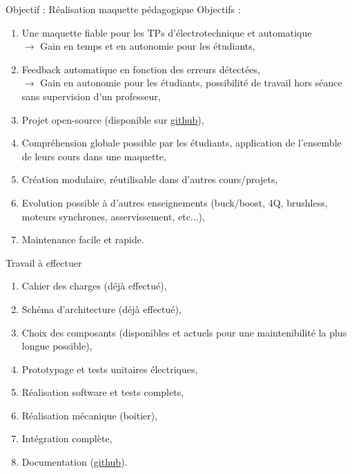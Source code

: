 \documentclass[aspectratio=169]{beamer}
\begin{document}
\begin{frame}{Objectif : Réalisation maquette pédagogique}
	Objectifs : 
	\begin{enumerate}
		\item Une maquette fiable pour les TPs d'électrotechnique et automatique \\
		$\rightarrow$ Gain en temps et en autonomie pour les étudiants,
		\item Feedback automatique en fonction des erreurs détectées, \\
		$\rightarrow$ Gain en autonomie pour les étudiants, possibilité de travail hors séance sans supervision d'un professeur,
		\item Projet open-source (disponible sur \href{https://github.com/DBXYD/AAP_ENSEA_Inverter}{github}),
		\item Compréhension globale possible par les étudiants, application de l'ensemble de leurs cours dans une maquette,
		\item Création modulaire, réutilisable dans d'autres cours/projets, 
		\item Evolution possible à d'autres enseignements (buck/boost, 4Q, brushless, moteurs synchrones, asservissement, etc...),
		\item Maintenance facile et rapide.
	\end{enumerate}
\end{frame}

\begin{frame}{Travail à effectuer}
\begin{enumerate}
	\item Cahier des charges (déjà effectué),
	\item Schéma d'architecture (déjà effectué),
	\item Choix des composants (disponibles et actuels pour une maintenibilité la plus longue possible),
	\item Prototypage et tests unitaires électriques,
	\item Réalisation software et tests complets,
	\item Réalisation mécanique (boitier),
	\item Intégration complète,
	\item Documentation (\href{https://github.com/DBXYD/AAP_ENSEA_Inverter}{github}).
\end{enumerate}
\end{frame}
\end{document}
